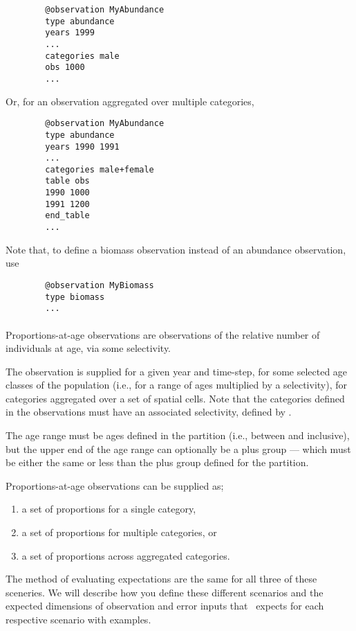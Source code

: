{\small{\begin{verbatim}
		@observation MyAbundance
		type abundance
		years 1999
		...
		categories male 
		obs 1000
		...
		\end{verbatim}}}

Or, for an observation aggregated over multiple categories,

{\small{\begin{verbatim}
		@observation MyAbundance
		type abundance
		years 1990 1991
		...
		categories male+female
		table obs
		1990 1000
		1991 1200
		end_table
		...
		\end{verbatim}}}


Note that, to define a biomass observation instead of an abundance observation, use 

{\small{\begin{verbatim}
		@observation MyBiomass
		type biomass
		...
		\end{verbatim}}}

\paragraph*{}
Proportions-at-age observations are observations of the relative number of individuals at age, via some selectivity. 

The observation is supplied for a given year and time-step, for some selected age classes of the population (i.e., for a range of ages multiplied by a selectivity), for categories aggregated over a set of spatial cells. Note that the categories defined in the observations must have an associated selectivity, defined by .

The age range must be ages defined in the partition (i.e., between  and  inclusive), but the upper end of the age range can optionally be a plus group --- which must be either the same or less than the plus group defined for the partition. 


Proportions-at-age observations can be supplied as; 
\begin{enumerate}
	\item a set of proportions for a single category, 
	\item a set of proportions for multiple categories, or
	\item a set of proportions across aggregated categories.
\end{enumerate}

The method of evaluating expectations are the same for all three of these sceneries. We will describe how you define these different scenarios and the expected dimensions of observation and error inputs that \CNAME\ expects for each respective scenario with examples.

